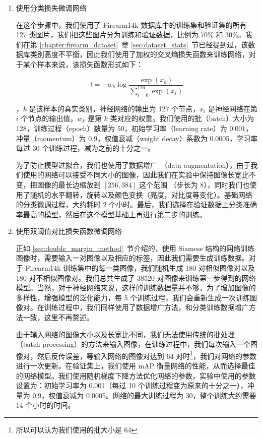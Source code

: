 \begin{enumerate}
\item 使用分类损失微调网络

在这个步骤中，我们使用了 Firearm14k 数据库中的训练集和验证集的所有 127 类图片，我们把这些图片分为训练和验证数据，比例为 70\% 和 30\%。我们在第 \ref{chapter:firearm_dataset}~章 \ref{sec:dataset_stats}~节已经提到过，该数据库类别高度不平衡，因此我们使用了加权的交叉熵损失函数来训练网络，对于某个样本来说，该损失函数形式如下：

\begin{equation}
l = -w_k \log\frac{\exp(x_k)}{\sum_{i=0}^{126} \exp(x_i)}
\end{equation}

，$k$ 是该样本的真实类别，神经网络的输出为 127 个节点，$x_i$ 是神经网络在第 $i$ 个节点的输出值，$w_k$ 是第 $k$ 类对应的权重。我们使用的批（batch）大小为 128，训练过程（epoch）数量为 50，初始学习率（learning rate）为 0.001，冲量（momentum）为 0.9，权值衰减（weight decay）系数为 0.0005，学习率每过 30 个训练过程，减为之前的十分之一。

为了防止模型过拟合，我们也使用了数据增广~\cite{Krizhevsky2012ImageNetCW}（data augmentation），由于我们使用的网络可以接受不同大小的图像，因此我们在实验中保持图像长宽比不变，把图像的最长边缩放到 $[256, 384]$ 这个范围 （步长为 8），同时我们也使用了随机的水平翻转，旋转以及颜色变换（亮度，对比度等变化）。基础网络的分类微调过程，大约耗时 2 个小时。最后，我们选择在验证数据上分类准确率最高的模型，然后在这个模型基础上再进行第二步的训练。

\item 使用双阈值对比损失函数微调网络

正如 \ref{sec:double_margin_method}~节介绍的，使用 Siamese 结构的网络训练图像时，需要输入一对图像以及相应的标签，因此我们需要生成训练数据。对于 Firearm14k 训练集中的每一类图像，我们随机生成 180 对相似图像对以及 180 对不相似图像对。我们总共生成了 38520 对图像来训练第一步得到的网络模型。当然，对于神经网络来说，这样的训练数据量并不够，为了增加图像的多样性，增强模型的泛化能力，每 5 个训练过程，我们会重新生成一次训练图像对。在训练过程中，我们同样使用了数据增广方法，和分类训练数据增广方法一致，这里不再赘述。

由于输入网络的图像大小以及长宽比不同，我们无法使用传统的批处理（batch processing）的方法来输入图像，在训练过程中，我们每次输入一个图像对，然后反传误差，等输入网络的图像对达到 64 对时\footnote{所以可以认为我们使用的批大小是 64}，我们对网络的参数进行一次更新。在验证集上，我们使用 mAP 衡量网络的性能，从而选择最佳的网络模型。我们使用随机梯度下降方法优化网络的参数，实验中使用的参数设置为：初始学习率为 0.001（每过 10 个训练过程变为原来的十分之一），冲量为 0.9，权值衰减为 0.0005。网络的最大训练过程为 30，整个训练大约需要 14 个小时的时间。
\end{enumerate}

